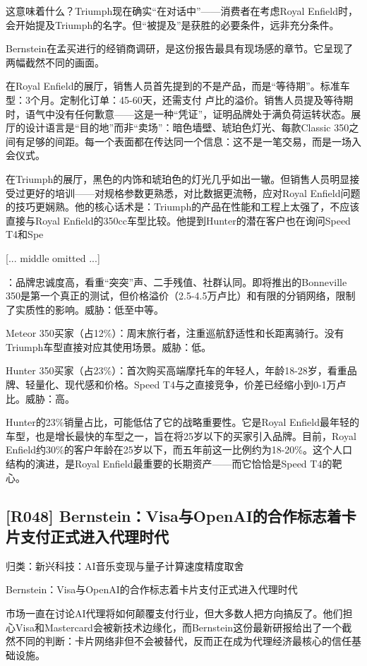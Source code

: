 \documentclass[11pt]{ctexart}
\begin{document}
这意味着什么？Triumph现在确实“在对话中”——消费者在考虑Royal Enfield时，会开始提及Triumph的名字。但“被提及”是获胜的必要条件，远非充分条件。

Bernstein在孟买进行的经销商调研，是这份报告最具有现场感的章节。它呈现了两幅截然不同的画面。

在Royal Enfield的展厅，销售人员首先提到的不是产品，而是“等待期”。标准车型：3个月。定制化订单：45-60天，还需支付 卢比的溢价。销售人员提及等待期时，语气中没有任何歉意——这是一种“凭证”，证明品牌处于满负荷运转状态。展厅的设计语言是“目的地”而非“卖场”：暗色墙壁、琥珀色灯光、每款Classic 350之间有足够的间距。每一个表面都在传达同一个信息：这不是一笔交易，而是一场入会仪式。

在Triumph的展厅，黑色的内饰和琥珀色的灯光几乎如出一辙。但销售人员明显接受过更好的培训——对规格参数更熟悉，对比数据更流畅，应对Royal Enfield问题的技巧更娴熟。他的核心话术是：Triumph的产品在性能和工程上太强了，不应该直接与Royal Enfield的350cc车型比较。他提到Hunter的潜在客户也在询问Speed T4和Spe

[... middle omitted ...]

：品牌忠诚度高，看重“突突”声、二手残值、社群认同。即将推出的Bonneville 350是第一个真正的测试，但价格溢价（2.5-4.5万卢比）和有限的分销网络，限制了实质性的影响。威胁：低至中等。

Meteor 350买家（占12\%）：周末旅行者，注重巡航舒适性和长距离骑行。没有Triumph车型直接对应其使用场景。威胁：低。

Hunter 350买家（占23\%）：首次购买高端摩托车的年轻人，年龄18-28岁，看重品牌、轻量化、现代感和价格。Speed T4与之直接竞争，价差已经缩小到0-1万卢比。威胁：高。

Hunter的23\%销量占比，可能低估了它的战略重要性。它是Royal Enfield最年轻的车型，也是增长最快的车型之一，旨在将25岁以下的买家引入品牌。目前，Royal Enfield约30\%的客户年龄在25岁以下，而五年前这一比例约为18-20\%。这个人口结构的演进，是Royal Enfield最重要的长期资产——而它恰恰是Speed T4的靶心。

\subsection{[R048] Bernstein：Visa与OpenAI的合作标志着卡片支付正式进入代理时代}
{\small\color{refgray}归类：新兴科技：AI音乐变现与量子计算速度精度取舍}

Bernstein：Visa与OpenAI的合作标志着卡片支付正式进入代理时代

市场一直在讨论AI代理将如何颠覆支付行业，但大多数人把方向搞反了。他们担心Visa和Mastercard会被新技术边缘化，而Bernstein这份最新研报给出了一个截然不同的判断：卡片网络非但不会被替代，反而正在成为代理经济最核心的信任基础设施。
\end{document}
